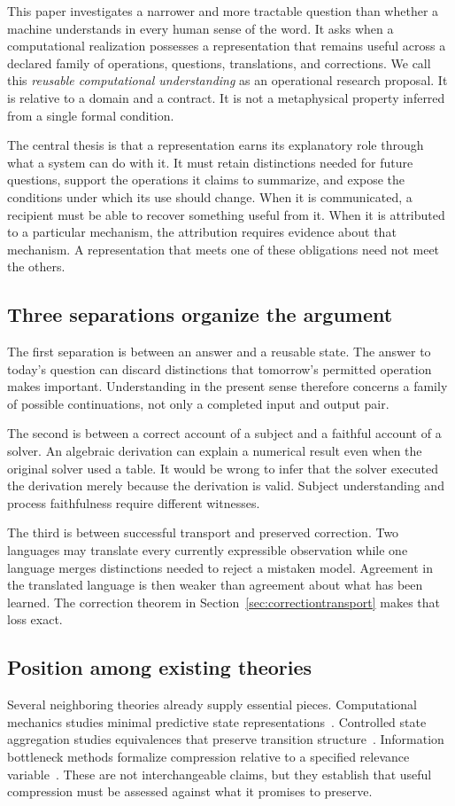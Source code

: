 \documentclass[11pt,letterpaper]{article}
\theoremstyle{plain}
\theoremstyle{definition}
\begin{document}
This paper investigates a narrower and more tractable question than whether a machine understands in every human sense of the word. It asks when a computational realization possesses a representation that remains useful across a declared family of operations, questions, translations, and corrections. We call this \emph{reusable computational understanding} as an operational research proposal. It is relative to a domain and a contract. It is not a metaphysical property inferred from a single formal condition.

The central thesis is that a representation earns its explanatory role through what a system can do with it. It must retain distinctions needed for future questions, support the operations it claims to summarize, and expose the conditions under which its use should change. When it is communicated, a recipient must be able to recover something useful from it. When it is attributed to a particular mechanism, the attribution requires evidence about that mechanism. A representation that meets one of these obligations need not meet the others.

\subsection{Three separations organize the argument}
The first separation is between an answer and a reusable state. The answer to today's question can discard distinctions that tomorrow's permitted operation makes important. Understanding in the present sense therefore concerns a family of possible continuations, not only a completed input and output pair.

The second is between a correct account of a subject and a faithful account of a solver. An algebraic derivation can explain a numerical result even when the original solver used a table. It would be wrong to infer that the solver executed the derivation merely because the derivation is valid. Subject understanding and process faithfulness require different witnesses.

The third is between successful transport and preserved correction. Two languages may translate every currently expressible observation while one language merges distinctions needed to reject a mistaken model. Agreement in the translated language is then weaker than agreement about what has been learned. The correction theorem in Section~\ref{sec:correctiontransport} makes that loss exact.

\subsection{Position among existing theories}
Several neighboring theories already supply essential pieces. Computational mechanics studies minimal predictive state representations~\cite{shalizi}. Controlled state aggregation studies equivalences that preserve transition structure~\cite{givan}. Information bottleneck methods formalize compression relative to a specified relevance variable~\cite{tishby}. These are not interchangeable claims, but they establish that useful compression must be assessed against what it promises to preserve.
\end{document}

